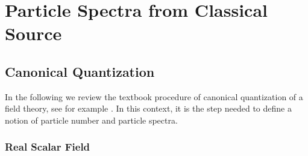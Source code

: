 \chapter{Particle Spectra from Classical Source}

\section{Canonical Quantization}

In the following we review the textbook procedure of canonical quantization of a field theory, see for example \cite{PeskinSchroeder_1995}. In this context, it is the step needed to define a notion of particle number and particle spectra.

\subsection{Real Scalar Field}


